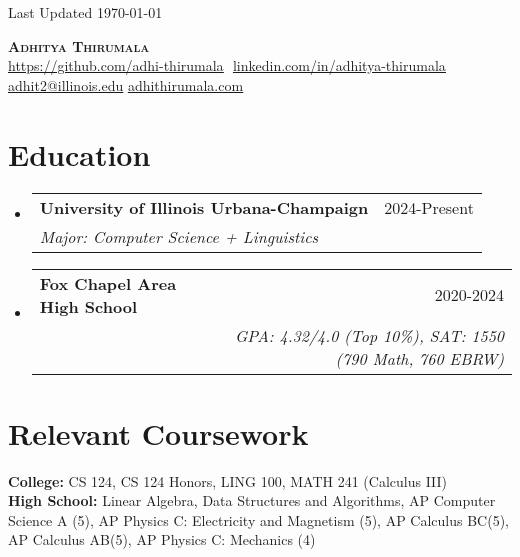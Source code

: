 \documentclass{article}
\makeatletter
\newcommand{\resumeSubheading}[4]{
  \vspace{-2pt}\item
    \begin{tabular*}{0.97\textwidth}[t]{l@{\extracolsep{\fill}}r}
      \textbf{#1} & #2 \\
      \textit{\small#3} & \textit{\small #4} \\
    \end{tabular*}\vspace{-7pt}
}
\newcommand{\resumeSubHeadingListStart}{\begin{itemize}[leftmargin=0.15in, label={}]}
\newcommand{\resumeSubHeadingListEnd}{\end{itemize}}
\makeatother
\begin{document}
\begin{flushright}
  \vspace{-4pt}
  \color{gray}
  \item
  Last Updated \today
\end{flushright}

\vspace{-7pt}

\begin{center}
    \textbf{{\Huge\scshape Adhitya Thirumala}} \\ \vspace{8pt}
    \small 
    \href{https://github.com/adhi-thirumala}{\underline{https://github.com/adhi-thirumala}} $  $
    \href{www.linkedin.com/in/adhitya-thirumala}
    {\underline{linkedin.com/in/adhitya-thirumala}} $  $
    \href{mailto:adhit2@illinois.edu}
    {\underline{adhit2@illinois.edu}}
    \href{https://www.adhithirumala.com}
    {\underline{adhithirumala.com}} $  $


\end{center}

\section{Education}
  \resumeSubHeadingListStart

    \resumeSubheading{University of Illinois Urbana-Champaign} {2024-Present} {Major: Computer Science + Linguistics}{}
    \resumeSubheading
      {Fox Chapel Area High School}{2020-2024}
      {}{GPA: 4.32/4.0 (Top 10\%), SAT: 1550 (790 Math, 760 EBRW)}
      \resumeSubHeadingListEnd
\vspace{-15pt}
    \section{Relevant Coursework}
    \begin{itemize}[leftmargin=0.15in, label={}]
    \small{\item{
       \textbf{College:}{ CS 124, CS 124 Honors, LING 100, MATH 241 (Calculus III)}\\
     \textbf{High School:}{ Linear Algebra, Data Structures and Algorithms, AP Computer Science A (5), AP Physics C: Electricity and Magnetism (5), AP Calculus BC(5), AP Calculus AB(5), AP Physics C: Mechanics (4)} \\
     
    }}
 \end{itemize}
\end{document}
